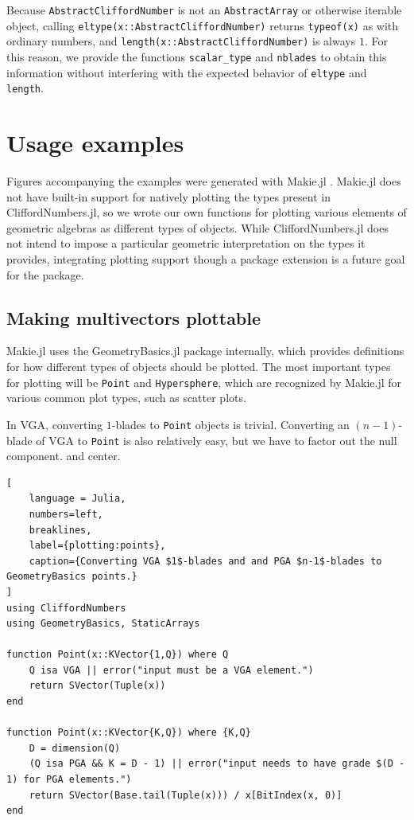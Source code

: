 \documentclass{juliacon}
\begin{document}
Because \texttt{AbstractCliffordNumber} is not an \texttt{AbstractArray} or otherwise iterable object, calling \texttt{eltype(x::AbstractCliffordNumber)} returns \texttt{typeof(x)} as with ordinary numbers, and \texttt{length(x::AbstractCliffordNumber)} is always $1$.
For this reason, we provide the functions \texttt{scalar_type} and \texttt{nblades} to obtain this information without interfering with the expected behavior of \texttt{eltype} and \texttt{length}.

\section{Usage examples}

Figures accompanying the examples were generated with Makie.jl \cite{Makie.jl}.
Makie.jl does not have built-in support for natively plotting the types present in CliffordNumbers.jl, so we wrote our own functions for plotting various elements of geometric algebras as different types of objects.
While CliffordNumbers.jl does not intend to impose a particular geometric interpretation on the types it provides, integrating plotting support though a package extension is a future goal for the package.

\subsection{Making multivectors plottable}

Makie.jl uses the GeometryBasics.jl package internally, which provides definitions for how different types of objects should be plotted.
The most important types for plotting will be \texttt{Point} and \texttt{Hypersphere}, which are recognized by Makie.jl for various common plot types, such as scatter plots.

In VGA, converting $1$-blades to \texttt{Point} objects is trivial.
Converting an $(n-1)$-blade of VGA to \texttt{Point} is also relatively easy, but we have to factor out the null component.
and center.
\begin{lstlisting}[
    language = Julia, 
    numbers=left,
    breaklines,
    label={plotting:points}, 
    caption={Converting VGA $1$-blades and and PGA $n-1$-blades to GeometryBasics points.}
]
using CliffordNumbers
using GeometryBasics, StaticArrays

function Point(x::KVector{1,Q}) where Q
    Q isa VGA || error("input must be a VGA element.")
    return SVector(Tuple(x))
end

function Point(x::KVector{K,Q}) where {K,Q}
    D = dimension(Q)
    (Q isa PGA && K = D - 1) || error("input needs to have grade $(D - 1) for PGA elements.")
    return SVector(Base.tail(Tuple(x))) / x[BitIndex(x, 0)]
end
\end{lstlisting}
\end{document}
